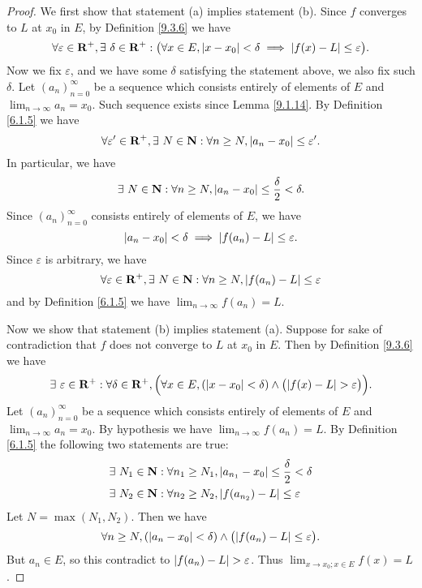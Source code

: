 \begin{proof}
    We first show that statement (a) implies statement (b).
    Since \(f\) converges to \(L\) at \(x_0\) in \(E\), by Definition \ref{9.3.6} we have
    \[
        \forall \varepsilon \in \mathbf{R}^+, \exists\ \delta \in \mathbf{R}^+ : \big(\forall x \in E, \abs*{x - x_0} < \delta \implies \abs*{f(x) - L} \leq \varepsilon\big).
    \]
    Now we fix \(\varepsilon\), and we have some \(\delta\) satisfying the statement above, we also fix such \(\delta\).
    Let \((a_n)_{n = 0}^\infty\) be a sequence which consists entirely of elements of \(E\) and \(\lim_{n \to \infty} a_n = x_0\).
    Such sequence exists since Lemma \ref{9.1.14}.
    By Definition \ref{6.1.5} we have
    \[
        \forall \varepsilon' \in \mathbf{R}^+, \exists\ N \in \mathbf{N} : \forall n \geq N, \abs*{a_n - x_0} \leq \varepsilon'.
    \]
    In particular, we have
    \[
        \exists\ N \in \mathbf{N} : \forall n \geq N, \abs*{a_n - x_0} \leq \frac{\delta}{2} < \delta.
    \]
    Since \((a_n)_{n = 0}^\infty\) consists entirely of elements of \(E\), we have
    \[
        \abs*{a_n - x_0} < \delta \implies \abs*{f(a_n) - L} \leq \varepsilon.
    \]
    Since \(\varepsilon\) is arbitrary, we have
    \[
        \forall \varepsilon \in \mathbf{R}^+, \exists\ N \in \mathbf{N} : \forall n \geq N, \abs*{f(a_n) - L} \leq \varepsilon
    \]
    and by Definition \ref{6.1.5} we have \(\lim_{n \to \infty} f(a_n) = L\).

    Now we show that statement (b) implies statement (a).
    Suppose for sake of contradiction that \(f\) does not converge to \(L\) at \(x_0\) in \(E\).
    Then by Definition \ref{9.3.6} we have
    \[
        \exists\ \varepsilon \in \mathbf{R}^+ : \forall \delta \in \mathbf{R}^+, \Big(\forall x \in E, (\abs*{x - x_0} < \delta) \land \big(\abs*{f(x) - L} > \varepsilon\big)\Big).
    \]
    Let \((a_n)_{n = 0}^\infty\) be a sequence which consists entirely of elements of \(E\) and \(\lim_{n \to \infty} a_n = x_0\).
    By hypothesis we have \(\lim_{n \to \infty} f(a_n) = L\).
    By Definition \ref{6.1.5} the following two statements are true:
    \begin{align*}
         & \exists\ N_1 \in \mathbf{N} : \forall n_1 \geq N_1, \abs*{a_{n_1} - x_0} \leq \frac{\delta}{2} < \delta \\
         & \exists\ N_2 \in \mathbf{N} : \forall n_2 \geq N_2, \abs*{f(a_{n_2}) - L} \leq \varepsilon
    \end{align*}
    Let \(N = \max(N_1, N_2)\).
    Then we have
    \[
        \forall n \geq N, (\abs*{a_n - x_0} < \delta) \land \big(\abs*{f(a_n) - L} \leq \varepsilon\big).
    \]
    But \(a_n \in E\), so this contradict to \(\abs*{f(a_n) - L} > \varepsilon\).
    Thus \(\lim_{x \to x_0 ; x \in E} f(x) = L\).
\end{proof}

